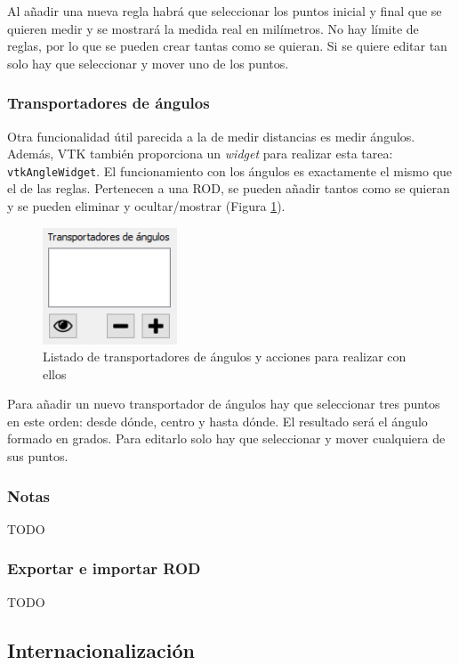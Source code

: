 Al añadir una nueva regla habrá que seleccionar los puntos inicial y final que se quieren medir y se mostrará la medida real en milímetros. No hay límite de reglas, por lo que se pueden crear tantas como se quieran. Si se quiere editar tan solo hay que seleccionar y mover uno de los puntos.

\subsubsection{Transportadores de ángulos}

Otra funcionalidad útil parecida a la de medir distancias es medir ángulos. Además, VTK también proporciona un \textit{widget} para realizar esta tarea: \texttt{vtkAngleWidget}. El funcionamiento con los ángulos es exactamente el mismo que el de las reglas. Pertenecen a una ROD, se pueden añadir tantos como se quieran y se pueden eliminar y ocultar/mostrar (Figura \ref{fig:desarrollo/gui-angulos}).

\begin{figure}[H]
	\centering
	\includegraphics[width=4cm]{imagenes/desarrollo/gui-angulos}
	\caption{Listado de transportadores de ángulos y acciones para realizar con ellos}
	\label{fig:desarrollo/gui-angulos}
\end{figure}

Para añadir un nuevo transportador de ángulos hay que seleccionar tres puntos en este orden: desde dónde, centro y hasta dónde. El resultado será el ángulo formado en grados. Para editarlo solo hay que seleccionar y mover cualquiera de sus puntos.

\subsubsection{Notas}

TODO

\subsubsection{Exportar e importar ROD}

TODO

\subsection{Internacionalización}

